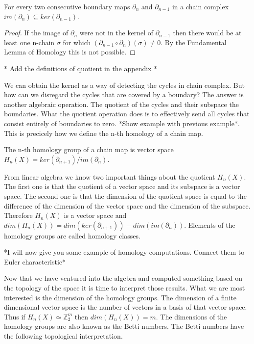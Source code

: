 \begin{cor}  For every two consecutive boundary maps $\partial_n$ and $\partial_{n-1}$ in a chain complex $im(\partial_n) \subseteq ker(\partial_{n-1})$. \end{cor}

\begin{proof}
    If the image of $\partial_n$ were not in the kernel of $\partial_{n-1}$ then there would be at least one n-chain $\sigma$ for which $(\partial_{n-1} \circ \partial_n) (\sigma) \ne 0$. By the Fundamental Lemma of Homology this is not possible.
\end{proof}


* Add the definitions of quotient in the appendix *

We can obtain the kernel as a way of detecting the cycles in chain complex. But how can we disregard the cycles that are covered by a boundary? The answer is another algebraic operation. The quotient of the cycles and their subspace the boundaries. What the quotient operation does is to effectively send all cycles that consist entirely of boundaries to zero. *Show example with previous example*. This is precicely how we define the n-th homology of a chain map.


\begin{defn} The n-th homology group of a chain map is vector space $H_n(X) = ker(\partial_{n+1})\big/im(\partial_n)$. \end{defn}

From linear algebra \cite{lin-alg-done-right} we know two important things about the quotient $H_n(X)$. The first one is that the quotient of a vector space and its subspace is a vector space. The second one is that the dimension of the quotient space is equal to the difference of the dimension of the vector space and the dimension of the subspace. Therefore $H_n(X)$ is a vector space and $dim(H_n(X)) = dim(ker(\partial_{n+1})) - dim(im(\partial_n))$. Elements of the homology groups are called homology classes.

*I will now give you some example of homology computations. Connect them to Euler characteristic*

Now that we have ventured into the algebra and computed something based on the topology of the space it is time to interpret those results. 
What we are most interested is the dimension of the homology groups. The dimension of a finite dimensional vector space is the number of vectors in a basis of that vector space. Thus if $H_n(X) \simeq \mathbb{Z}_2^m$ then $dim(H_n(X)) = m$. The dimensions of the homology groups are also known as the Betti numbers. The Betti numbers have the following topological interpretation.


